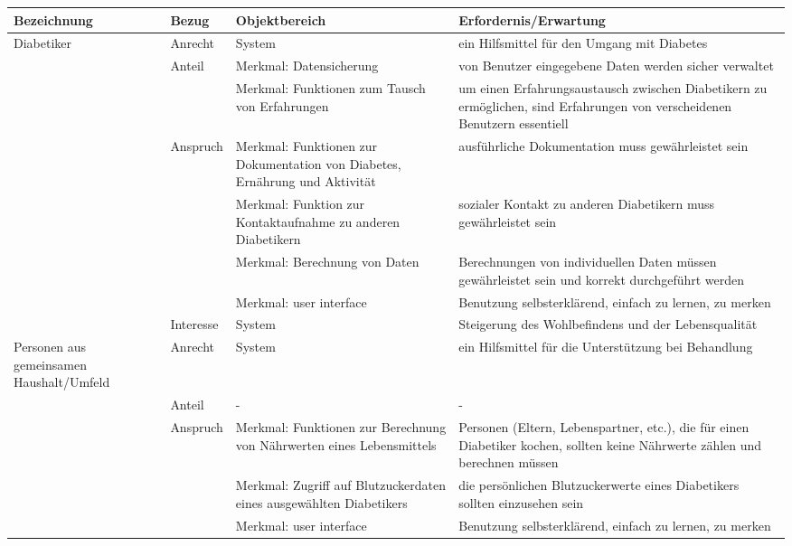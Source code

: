 	\begin{center}
		\begin{longtable}[H]{|p{3cm}|p{2cm}|p{4cm}|p{4.5cm}|}
			\hline
			\textbf{Bezeichnung} & \textbf{Bezug} & \textbf{Objektbereich} & \textbf{Erfordernis/Erwartung}\\
			\hline
			Diabetiker & Anrecht & System & ein Hilfsmittel für den Umgang mit Diabetes\\
			\cline{2-4}
			& Anteil & Merkmal: Datensicherung & von Benutzer eingegebene Daten werden sicher verwaltet\\
			\cline{3-4}
			& & Merkmal: Funktionen zum Tausch von Erfahrungen & um einen Erfahrungsaustausch zwischen Diabetikern zu ermöglichen, sind Erfahrungen von verscheidenen Benutzern essentiell\\
			\cline{2-4}
			& Anspruch & Merkmal: Funktionen zur Dokumentation von Diabetes, Ernährung und Aktivität & ausführliche Dokumentation muss gewährleistet sein\\
			\cline{3-4}
			& & Merkmal: Funktion zur Kontaktaufnahme zu anderen Diabetikern & sozialer Kontakt zu anderen Diabetikern muss gewährleistet sein\\
			\cline{3-4}
			& & Merkmal: Berechnung von Daten & Berechnungen von individuellen Daten müssen gewährleistet sein und korrekt durchgeführt werden\\
			\cline{3-4}
			\newpage
			\cline{3-4}
			& & Merkmal: user interface & Benutzung selbsterklärend, einfach zu lernen, zu merken\\
			\cline{2-4}
			& Interesse & System & Steigerung des Wohlbefindens und der Lebensqualität\\
			\hline
			Personen aus gemeinsamen Haushalt/Umfeld & Anrecht & System & ein Hilfsmittel für die Unterstützung bei Behandlung\\
			\cline{2-4}
			& Anteil & - & - \\
			\cline{2-4}
			& Anspruch & Merkmal: Funktionen zur Berechnung von Nährwerten eines Lebensmittels & Personen (Eltern, Lebenspartner, etc.), die für einen Diabetiker kochen, sollten keine Nährwerte zählen und berechnen müssen\\
			\cline{3-4}
			& & Merkmal: Zugriff auf Blutzuckerdaten eines ausgewählten Diabetikers & die persönlichen Blutzuckerwerte eines Diabetikers sollten einzusehen sein\\
			\cline{3-4}
			& & Merkmal: user interface & Benutzung selbsterklärend, einfach zu lernen, zu merken\\
			\cline{2-4}

\end{longtable}
\end{center}
